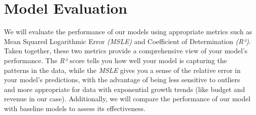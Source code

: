\documentclass[conference]{IEEEtran}
\begin{document}
\section{Model Evaluation}
    We will evaluate the performance of our models using appropriate metrics such as Mean Squared Logarithmic Error \textit{(MSLE)} and Coefficient of Determination \textit{(R²)}. Taken together, these two metrics provide a comprehensive view of your model's performance. The \textit{R²} score tells you how well your model is capturing the patterns in the data, while the \textit{MSLE} gives you a sense of the relative error in your model's predictions, with the advantage of being less sensitive to outliers and more appropriate for data with exponential growth trends (like budget and revenue in our case). Additionally, we will compare the performance of our model with baseline models to assess its effectiveness.
\end{document}
